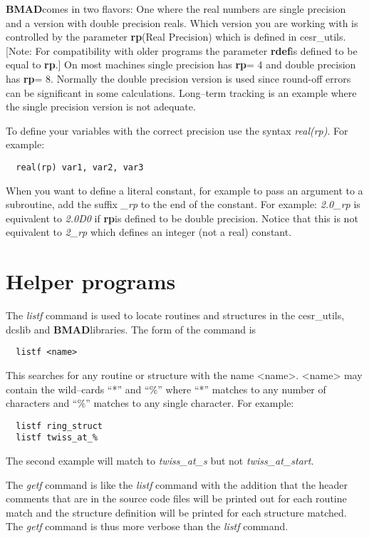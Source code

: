 \documentclass{book}
\newcommand{\bmad}{{\bf BMAD}}
\newcommand{\rp}{{\bf rp}}
\newcommand{\rdef}{{\bf rdef}}
\begin{document}
\bmad comes in two flavors: One where the real numbers are single
precision and a version with double precision reals. Which version you
are working with is controlled by the parameter \rp (Real Precision)
which is defined in cesr\_utils. [Note: For compatibility with older
programs the parameter \rdef is defined to be equal to \rp.]  On most
machines single precision has \rp = 4 and double precision has \rp =
8. Normally the double precision version is used since round-off
errors can be significant in some calculations. Long--term tracking is
an example where the single precision version is not adequate. 

To define your variables with the correct precision use the syntax
{\it real(rp)}. For example:
\begin{verbatim}
  real(rp) var1, var2, var3
\end{verbatim}
When you want to define a literal constant, for example to pass an
argument to a subroutine, add the suffix {\it \_rp} to the end of the
constant. For example: {\it 2.0\_rp} is equivalent to {\it 2.0D0} if
\rp is defined to be double precision. Notice that this is not
equivalent to {\it 2\_rp} which defines an integer (not a real) constant.


\section{Helper programs}

The {\it listf} command is used to locate routines and structures in
the cesr\_utils, dcslib and \bmad libraries. The form of the command is
\begin{verbatim}
  listf <name>
\end{verbatim}
This searches for any routine or structure with the name
<name>. <name> may contain the wild--cards ``*'' and ``\%'' where
``*'' matches to any number of characters and ``\%'' matches to any
single character. For example:
\begin{verbatim}
  listf ring_struct
  listf twiss_at_%
\end{verbatim}
The second example will match to {\it twiss\_at\_s} but not {\it
twiss\_at\_start}.

The {\it getf} command is like the {\it listf} command with the
addition that the header comments that are in the source code files
will be printed out for each routine match and the structure definition
will be printed for each structure matched. The {\it getf} command is
thus more verbose than the {\it listf} command.
\end{document}
